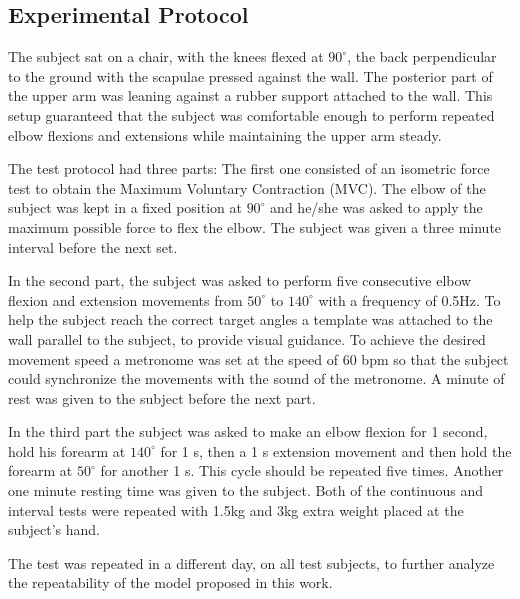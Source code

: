 \documentclass[letterpaper, 10 pt, conference]{ieeeconf}  %
\begin{document}
\subsection{Experimental Protocol}


The subject sat on a chair, with the knees flexed at \(90^{\circ}\), the back perpendicular to the ground with the scapulae pressed against the wall. The posterior part of the upper arm was leaning against a rubber support attached to the wall. This setup guaranteed that the subject was comfortable enough to perform repeated elbow flexions and extensions while maintaining the upper arm steady. 

The test protocol had three parts: The first one consisted of an isometric force test to obtain the Maximum Voluntary Contraction (MVC). The elbow of the subject was kept in a fixed position at \(90^{\circ}\) and he/she was asked to apply the maximum possible force to flex the elbow. The subject was given a three minute interval before the next set.

In the second part, the subject was asked to perform five consecutive elbow flexion and extension movements from  \(50^{\circ}\) to \(140^{\circ}\) with a frequency of 0.5Hz. To help the subject reach the correct target angles a template was attached to the wall parallel to the subject, to provide visual guidance. To achieve the desired movement speed a metronome was set at the speed of 60 bpm so that the subject could synchronize the movements with the sound of the metronome. A minute of rest was given to the subject before the next part.

In the third part the subject was asked to make an elbow flexion for 1 second, hold his forearm at \(140^{\circ}\) for 1 s, then a 1 s extension movement and then hold the forearm at \(50^{\circ}\) for another 1 s. This cycle should be repeated five times. Another one minute resting time was given to the subject.
Both of the continuous and interval tests were repeated with 1.5kg and 3kg extra weight placed at the subject's hand.

The test was repeated in a different day, on all test subjects, to further analyze the repeatability of the model proposed in this work.
\end{document}
